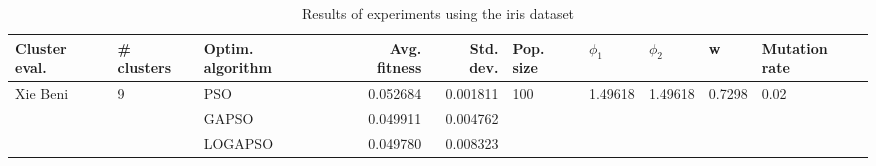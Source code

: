 \begin{table}
\centering
\caption{Results of experiments using the iris dataset}
\begin{tabular}{lllrrlllll}
\toprule
            Cluster eval. &        \# clusters & Optim. algorithm &  Avg. fitness &  Std. dev. &            Pop. size &               $\phi_{1}$ &               $\phi_{2}$ &                       w &         Mutation rate \\
\midrule
\multirow{3}{*}{Xie Beni} & \multirow{3}{*}{9} &              PSO &      0.052684 &   0.001811 & \multirow{3}{*}{100} & \multirow{3}{*}{1.49618} & \multirow{3}{*}{1.49618} & \multirow{3}{*}{0.7298} & \multirow{3}{*}{0.02} \\
                          &                    &            GAPSO &      0.049911 &   0.004762 &                      &                          &                          &                         &                       \\
                          &                    &          LOGAPSO &      0.049780 &   0.008323 &                      &                          &                          &                         &                       \\
\bottomrule
\end{tabular}
\end{table}
